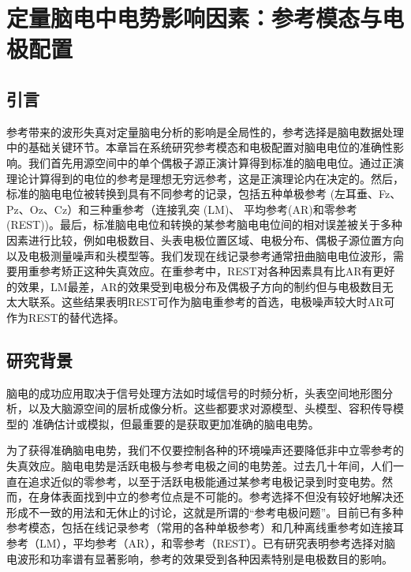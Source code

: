 \chapter{定量脑电中电势影响因素：参考模态与电极配置}
\section{引言}
参考带来的波形失真对定量脑电分析的影响是全局性的，参考选择是脑电数据处理中的基础关键环节。本章旨在系统研究参考模态和电极配置对脑电电位的准确性影响。我们首先用源空间中的单个偶极子源正演计算得到标准的脑电电位。通过正演理论计算得到的电位的参考是理想无穷远参考，这是正演理论内在决定的。然后，标准的脑电电位被转换到具有不同参考的记录，包括五种单极参考 (左耳垂、Fz、Pz、Oz、Cz）和三种重参考（连接乳突 (LM)、
平均参考(AR)和零参考(REST))。最后，标准脑电电位和转换的某参考脑电电位间的相对误差被关于多种因素进行比较，例如电极数目、头表电极位置区域、电极分布、偶极子源位置方向以及电极测量噪声和头模型等。我们发现在线记录参考通常扭曲脑电电位波形，需要用重参考矫正这种失真效应。在重参考中，REST对各种因素具有比AR有更好的效果，LM最差，AR的效果受到电极分布及偶极子方向的制约但与电极数目无太大联系。这些结果表明REST可作为脑电重参考的首选，电极噪声较大时AR可作为REST的替代选择。

\section{研究背景}
脑电的成功应用取决于信号处理方法如时域信号的时频分析，头表空间地形图分析，以及大脑源空间的层析成像分析。这些都要求对源模型、头模型、容积传导模型的
准确估计或模拟，但最重要的是获取更加准确的脑电电势。

为了获得准确脑电电势，我们不仅要控制各种的环境噪声还要降低非中立零参考的失真效应。脑电电势是活跃电极与参考电极之间的电势差。过去几十年间，人们一直在追求近似的零参考，以至于活跃电极能通过某参考电极记录到时变电势。然而，在身体表面找到中立的参考位点是不可能的。参考选择不但没有较好地解决还形成不一致的用法和无休止的讨论，这就是所谓的“参考电极问题”。目前已有多种参考模态，包括在线记录参考（常用的各种单极参考）和几种离线重参考如连接耳参考（LM），平均参考（AR），和零参考（REST）。已有研究表明参考选择对脑电波形和功率谱有显著影响，参考的效果受到各种因素特别是电极数目的影响。

